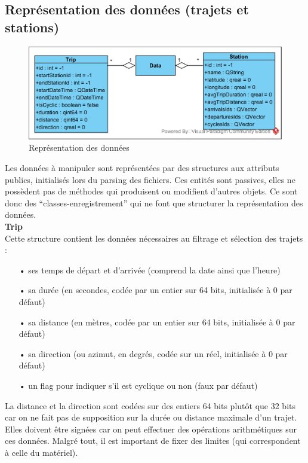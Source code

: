 \documentclass[12pt]{article}
\begin{document}
		\subsection{Représentation des données (trajets et stations)}
		\begin{figure}[!h]
		\begin{center}
		\includegraphics[scale=1]{dia_class_data.png}
		\caption{Représentation des données}
		\end{center}
		\end{figure}		
			
		Les données à manipuler sont représentées par des structures aux attributs publics,
		initialisés lors du parsing des fichiers. Ces entités sont passives, elles ne possèdent
		pas de méthodes qui produisent ou modifient d’autres objets. Ce sont
		donc des “classes-enregistrement” qui ne font que structurer la représentation des
		données.\\		
			
		\textbf{Trip}\\
		Cette structure contient les données nécessaires au filtrage et sélection des
		trajets :\\		
		\begin{itemize}
			\item[•]ses temps de départ et d’arrivée (comprend la date ainsi que l’heure)
			\item[•]sa durée (en secondes, codée par un entier sur 64 bits, initialisée à
			0 par défaut)
			\item[•]sa distance (en mètres, codée par un entier sur 64 bits, initialisée
			à 0 par défaut)
			\item[•]sa direction (ou azimut, en degrés, codée sur un réel, initialisée à
			0 par défaut)
			\item[•]un flag pour indiquer s’il est cyclique ou non (faux par défaut)\\
		\end{itemize}
			
		La distance et la direction sont codées sur des entiers 64 bits plutôt que 32 bits car on ne fait pas de supposition sur la durée ou distance maximale d’un trajet. Elles doivent être signées car on peut effectuer des opérations arithmétiques sur ces données. Malgré tout, il est important de fixer des limites (qui correspondent à celle du matériel).\\
			
\end{document}
